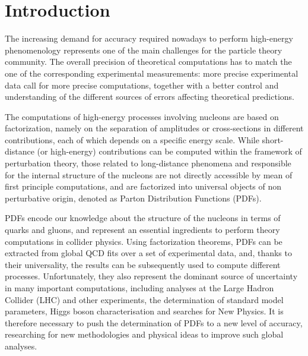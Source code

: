 \chapter*{Introduction}
The increasing demand for accuracy required nowadays to perform high-energy phenomenology
represents one of the main challenges for the particle theory community. The
overall precision of theoretical computations has to match the one of the corresponding
experimental measurements: more precise  
experimental data call for more precise computations, together with a better control
and understanding of the different sources of errors affecting theoretical predictions. 

The computations of high-energy processes involving nucleons are based on factorization, namely on the separation
of amplitudes or cross-sections in different contributions, each of which depends on a specific energy scale.
While short-distance (or high-energy) contributions can be computed within the framework of perturbation theory,
those related to long-distance phenomena and responsible for the internal
structure of the nucleons are not directly accessible by mean of first principle computations, 
and are factorized into universal objects of non perturbative origin, denoted as Parton Distribution Functions (PDFs).
 
PDFs encode our knowledge about the structure of the nucleons in terms of quarks and
gluons, and represent an essential ingredients to perform theory computations in collider physics.
Using factorization theorems, PDFs can be extracted from global QCD fits
over a set of experimental data, and, thanks to their universality, the results can be subsequently used
to compute different processes. 
Unfortunately, they also represent the dominant source of uncertainty in many important computations,
including analyses at the Large Hadron Collider (LHC) and other experiments,
the determination of standard model parameters, Higgs boson characterisation and searches for New Physics.
It is therefore necessary to push the determination of PDFs to a new level of accuracy,
researching for new methodologies and physical ideas to improve such global analyses.

